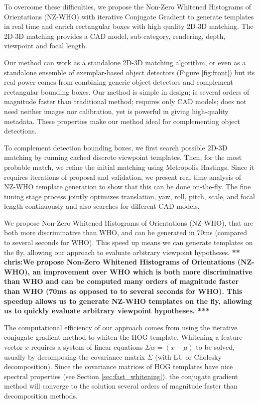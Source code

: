 \documentclass[10pt,twocolumn,letterpaper]{article}
\newcommand{\scream}[1]{{\color{red} \bf *** #1 ***}}
\begin{document}
To overcome these difficulties, we propose the Non-Zero Whitened
Histograms of Orientations (NZ-WHO) with iterative Conjugate Gradient to
generate templates in real time and enrich rectangular boxes with high
quality 2D-3D matching. The 2D-3D matching provides a CAD model,
sub-category, rendering, depth, viewpoint and focal length.

Our method can work as a standalone 2D-3D matching algorithm, or even
as a standalone ensemble of exemplar-based object detectors (Figure
\ref{fig:front}) but its real power comes from combining generic
object detectors and complement rectangular bounding boxes. Our method
is simple in design; is several orders of magnitude faster than
traditional method; requires only CAD models; does not need neither images nor
calibration, yet is powerful in giving high-quality metadata. These
properties make our method ideal for complementing object detections. 

To complement detection bounding boxes, we first search possible 2D-3D
matching by running cached discrete viewpoint templates. Then, for the
most probable match, we refine the initial matching using Metropolis
Hastings. Since it requires iterations of proposal and validation, we
present real time analysis of NZ-WHO template generation to show that
this can be done on-the-fly. The fine tuning stage process jointly
optimizes translation, yaw, roll, pitch, scale, and focal length
continuously and also searches for different CAD models.

We propose Non-Zero Whitened Histograms of Orientations (NZ-WHO), that are both more discriminative than WHO, and can be generated in 70ms (compared to several seconds for WHO). This speed up means we can generate templates on the fly, allowing our approach to evaluate arbitrary viewpoint hypotheses. 
\scream{chris:We propose Non-Zero Whitened Histograms of Orientations (NZ-WHO), an improvement over WHO which is both more discriminative than WHO and can be computed many orders of magnitude faster than WHO (70ms as opposed to to several seconds for WHO). This speedup allows us to generate NZ-WHO templates on the fly, allowing us to quickly evaluate arbitrary viewpoint hypotheses.}

The computational efficiency of our approach comes from using the iterative conjugate gradient method to whiten the HOG template. Whitening a feature vector $x$ requires a system of linear equations $\Sigma w = (x - \mu)$ to be solved, usually by decomposing the covariance matrix $\Sigma$ (with LU or Cholesky decomposition). Since the covariance matrices of HOG templates have nice spectral properties (see Section \ref{sec:fast_whitening}), the conjugate gradient method will converge to the solution several orders of magnitude faster than decomposition methods.
\end{document}
